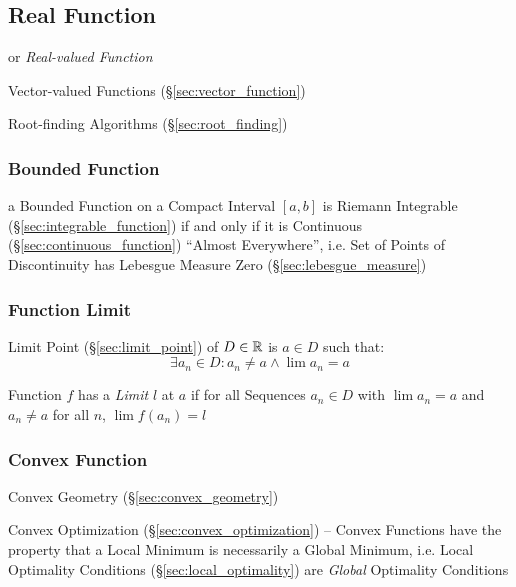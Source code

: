 \subsection{Real Function}\label{sec:real_function}

or \emph{Real-valued Function}

\fist Vector-valued Functions (\S\ref{sec:vector_function})

\fist Root-finding Algorithms (\S\ref{sec:root_finding})



\subsubsection{Bounded Function}\label{sec:bounded_function}

a Bounded Function on a Compact Interval $[a,b]$ is Riemann Integrable
(\S\ref{sec:integrable_function}) if and only if it is Continuous
(\S\ref{sec:continuous_function}) ``Almost Everywhere'', i.e. Set of Points of
Discontinuity has Lebesgue Measure Zero (\S\ref{sec:lebesgue_measure})



\subsubsection{Function Limit}\label{sec:function_limit}

Limit Point (\S\ref{sec:limit_point}) of $D \in \mathbb{R}$ is $a \in D$
such that:
\[
  \exists a_n \in D : a_n \neq a \wedge \lim a_n = a
\]

Function $f$ has a \emph{Limit} $l$ at $a$ if for all Sequences $a_n
\in D$ with $\lim a_n = a$ and $a_n \neq a$ for all $n$, $\lim f(a_n)
= l$



\subsubsection{Convex Function}\label{sec:convex_function}

\fist Convex Geometry (\S\ref{sec:convex_geometry})

\fist Convex Optimization (\S\ref{sec:convex_optimization}) -- Convex Functions
have the property that a Local Minimum is necessarily a Global Minimum, i.e.
Local Optimality Conditions (\S\ref{sec:local_optimality}) are \emph{Global}
Optimality Conditions

